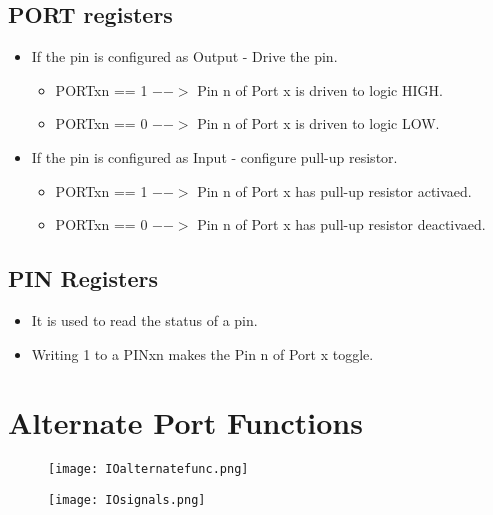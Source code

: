 \documentclass{article}
\begin{document}
\subsection{PORT registers}
\begin{itemize}
    \item If the pin is configured as Output - Drive the pin.
    \begin{itemize}
        \item PORTxn == 1 $-->$ Pin n of Port x is driven to logic HIGH.
        \item PORTxn == 0 $-->$ Pin n of Port x is driven to logic LOW.
    \end{itemize}
    \item If the pin is configured as Input - configure pull-up resistor.
    \begin{itemize}
        \item PORTxn == 1 $-->$ Pin n of Port x has pull-up resistor activaed.
        \item PORTxn == 0 $-->$ Pin n of Port x has pull-up resistor deactivaed.
    \end{itemize}
\end{itemize}

\subsection{PIN Registers}
\begin{itemize}
    \item It is used to read the status of a pin.
    \item Writing 1 to a PINxn makes the Pin n of Port x toggle.
\end{itemize}

\section{Alternate Port Functions}
\begin{figure}[H]
    \begin{center}
        \texttt{[image: IOalternatefunc.png]}
    \end{center}
\end{figure}

\begin{figure}[H]
    \begin{center}
        \texttt{[image: IOsignals.png]}
    \end{center}
\end{figure}
\end{document}
